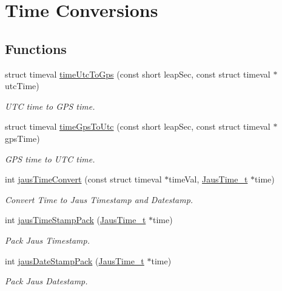 \hypertarget{group__time__conv}{
\section{Time Conversions}
\label{group__time__conv}
}
\subsection*{Functions}
\begin{CompactItemize}
\item 
struct timeval \hyperlink{group__time__conv_gd96aa6054228a1751cc4361c09faf60c}{timeUtcToGps} (const short leapSec, const struct timeval $\ast$utcTime)
\begin{CompactList}\small\item\em UTC time to GPS time. \item\end{CompactList}\item 
struct timeval \hyperlink{group__time__conv_gdc88a6af3e3644ef9874e2cb55aa1976}{timeGpsToUtc} (const short leapSec, const struct timeval $\ast$gpsTime)
\begin{CompactList}\small\item\em GPS time to UTC time. \item\end{CompactList}\item 
int \hyperlink{group__time__conv_gfabd8046b6f8c5c8c8ba591a283ce5cf}{jausTimeConvert} (const struct timeval $\ast$timeVal, \hyperlink{structJausTime__t}{JausTime\_\-t} $\ast$time)
\begin{CompactList}\small\item\em Convert Time to Jaus Timestamp and Datestamp. \item\end{CompactList}\item 
int \hyperlink{group__time__conv_gefa61d2f15de88919f2c623b39edb394}{jausTimeStampPack} (\hyperlink{structJausTime__t}{JausTime\_\-t} $\ast$time)
\begin{CompactList}\small\item\em Pack Jaus Timestamp. \item\end{CompactList}\item 
int \hyperlink{group__time__conv_g8c18bc24bd1c4d704a2e475a95649dbc}{jausDateStampPack} (\hyperlink{structJausTime__t}{JausTime\_\-t} $\ast$time)
\begin{CompactList}\small\item\em Pack Jaus Datestamp. \item\end{CompactList}\item 

\end{CompactItemize}
